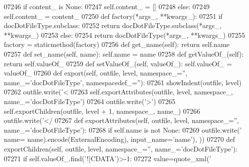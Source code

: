 \begin{DoxyCode}
{{{{{{{{{{{{{{{{{{{{{{{{{{{{{{{{{{{{{{{{{{{{{{{{{{{{{{{{{{{{{{{{{{{{{{{{{{{{{{{{{{{{{{{{{{{{{{{{{{{{{{{{{{{{{{{{{{{{{{{{{{{{{{{{{{{{{{{{{{{{{{{{{{{{{{{{{{{{{{{{{{{{{{{{{{{{{{{{{{{{{{{{{{{{{{{{{{{{{{{{{{{{{{{{{{{{{{{{{{{{{{{{{{{{{{{{{{{{{{{{{{{{{{{{{{{{{{{{{{{{{{{{{{{{{{{{{{{{{{{{{{{{{{{{{{{{{{{{{{{{{{{{{{{{{{{{{{{{{{{{{{{{{{{{{{{{{{{{{{{{{{{{{{{{{{{{{{{{{{{{{{{{{{{{{{{{{{{{{{{{{{{{{{{{{{{{{{{{{{{{{{{{{{{{{{{{{{{{{{{{{{{{{{{{{{{{{{{{{{{{{{{{{{{{{{{{{{07246         \textcolor{keywordflow}{if} content\_ \textcolor{keywordflow}{is} \textcolor{keywordtype}{None}:
07247             self.content_ = []
07248         \textcolor{keywordflow}{else}:
07249             self.content_ = content\_
07250     \textcolor{keyword}{def }factory(*args\_, **kwargs\_):
07251         \textcolor{keywordflow}{if} docDotFileType.subclass:
07252             \textcolor{keywordflow}{return} docDotFileType.subclass(*args\_, **kwargs\_)
07253         \textcolor{keywordflow}{else}:
07254             \textcolor{keywordflow}{return} docDotFileType(*args\_, **kwargs\_)
07255     factory = staticmethod(factory)
07256     \textcolor{keyword}{def }get_name(self): \textcolor{keywordflow}{return} self.name
07257     \textcolor{keyword}{def }set_name(self, name): self.name = name
07258     \textcolor{keyword}{def }getValueOf_(self): \textcolor{keywordflow}{return} self.valueOf\_
07259     \textcolor{keyword}{def }setValueOf_(self, valueOf\_): self.valueOf\_ = valueOf\_
07260     \textcolor{keyword}{def }export(self, outfile, level, namespace\_='', name\_='docDotFileType', namespacedef\_=''):
07261         showIndent(outfile, level)
07262         outfile.write(\textcolor{stringliteral}{'<%
07263         self.exportAttributes(outfile, level, namespace\_, name\_=\textcolor{stringliteral}{'docDotFileType'})
07264         outfile.write(\textcolor{stringliteral}{'>'})
07265         self.exportChildren(outfile, level + 1, namespace\_, name\_)
07266         outfile.write(\textcolor{stringliteral}{'</%
07267     \textcolor{keyword}{def }exportAttributes(self, outfile, level, namespace\_='', name\_='docDotFileType'):
07268         \textcolor{keywordflow}{if} self.name \textcolor{keywordflow}{is} \textcolor{keywordflow}{not} \textcolor{keywordtype}{None}:
07269             outfile.write(\textcolor{stringliteral}{' name=%
      name).encode(ExternalEncoding), input\_name=\textcolor{stringliteral}{'name'}), ))
07270     \textcolor{keyword}{def }exportChildren(self, outfile, level, namespace\_='', name\_='docDotFileType'):
07271         \textcolor{keywordflow}{if} self.valueOf\_.find(\textcolor{stringliteral}{'![CDATA'})>-1:
07272             value=quote_xml(\textcolor{stringliteral}{'%
}}}}}}}}}}}}}}}}}}}}}}}}}}}}}}}}}}}}}}}}}}}}}}}}}}}}}}}}}}}}}}}}}}}}}}}}}}}}}}}}}}}}}}}}}}}}}}}}}}}}}}}}}}}}}}}}}}}}}}}}}}}}}}}}}}}}}}}}}}}}}}}}}}}}}}}}}}}}}}}}}}}}}}}}}}}}}}}}}}}}}}}}}}}}}}}}}}}}}}}}}}}}}}}}}}}}}}}}}}}}}}}}}}}}}}}}}}}}}}}}}}}}}}}}}}}}}}}}}}}}}}}}}}}}}}}}}}}}}}}}}}}}}}}}}}}}}}}}}}}}}}}}}}}}}}}}}}}}}}}}}}}}}}}}}}}}}}}}}}}}}}}}}}}}}}}}}}}}}}}}}}}}}}}}}}}}}}}}}}}}}}}}}}}}}}}}}}}}}}}}}}}}}}}}}}}}}}}}}}}}}}}}}}}}}}}}}}}}}}}}}}}}}}}}}}}}}}}}}}
\end{DoxyCode}
